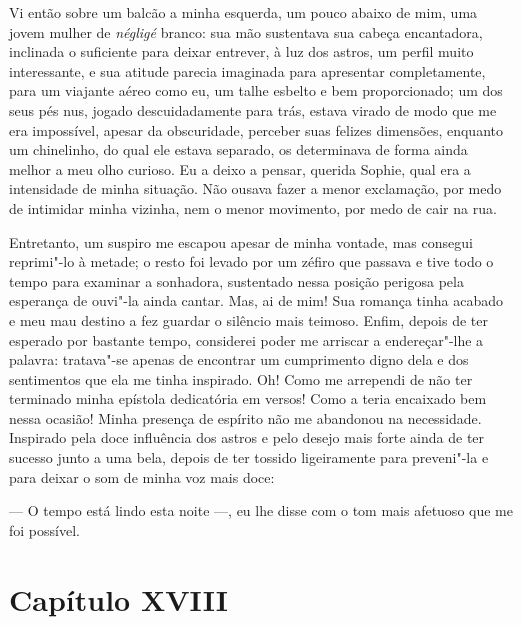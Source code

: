  Vi então sobre um balcão a minha esquerda, um pouco abaixo de mim, uma
jovem mulher de \textit{négligé} branco: sua mão sustentava sua cabeça
encantadora, inclinada o suficiente para deixar entrever, à luz dos
astros, um perfil muito interessante, e sua atitude parecia imaginada
para apresentar completamente, para um viajante aéreo como eu, um talhe
esbelto e bem proporcionado; um dos seus pés nus, jogado
descuidadamente para trás, estava virado de modo que me era impossível,
apesar da obscuridade, perceber suas felizes dimensões, enquanto um
chinelinho, do qual ele estava separado, os determinava de forma ainda
melhor a meu olho curioso. Eu a deixo a pensar, querida Sophie, qual
era a intensidade de minha situação. Não ousava fazer a menor
exclamação, por medo de intimidar minha vizinha, nem o menor movimento,
por medo de cair na rua.

 Entretanto, um suspiro me escapou apesar de minha vontade, mas consegui
reprimi"-lo à metade; o resto foi levado por um zéfiro que passava e
tive todo o tempo para examinar a sonhadora, sustentado nessa posição
perigosa pela esperança de ouvi"-la ainda cantar. Mas, ai de mim! Sua
romança tinha acabado e meu mau destino a fez guardar o silêncio mais
teimoso. Enfim, depois de ter esperado por bastante tempo, considerei
poder me arriscar a endereçar"-lhe a palavra: tratava"-se apenas de
encontrar um cumprimento digno dela e dos sentimentos que ela me tinha
inspirado. Oh! Como me arrependi de não ter terminado minha epístola
dedicatória em versos! Como a teria encaixado bem nessa ocasião! Minha
presença de espírito não me abandonou na necessidade. Inspirado pela
doce influência dos astros e pelo desejo mais forte ainda de ter
sucesso junto a uma bela, depois de ter tossido ligeiramente para
preveni"-la e para deixar o som de minha voz mais doce:

 --- O tempo está lindo esta noite ---, eu lhe disse com o tom mais
afetuoso que me foi possível.

\section*{Capítulo XVIII}

